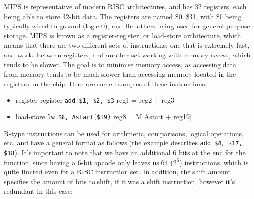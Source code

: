 \documentclass[a4paper, 12pt]{article}
\begin{document}
            MIPS is representative of modern RISC architectures, and has 32 registers, each being able to store 32-bit data. The registers are named \$0..\$31, with \$0 being typically wired to ground (logic 0), and the others being used for general-purpose storage. MIPS is known as a register-register, or load-store architecture, which means that there are two different sets of instructions; one that is extremely fast, and works between registers, and another set working with memory access, which tends to be slower. The goal is to minimise memory access, as accessing data from memory tends to be much slower than accessing memory located in the registers on the chip. Here are some examples of these instructions;
            \begin{itemize}
                \itemsep0em
                \item register-register
                    \subitem \texttt{add \$1, \$2, \$3} \hfill reg1 = reg2 + reg3
                \item load-store
                    \subitem \texttt{lw \$8, Astart(\$19)} \hfill reg8 = M[Astart + reg19]
            \end{itemize}
            R-type instructions can be used for arithmetic, comparisons, logical operations, etc. and have a general format as follows (the example describes \texttt{add \$8, \$17, \$18}). It's important to note that we have an additional 6 bits at the end for the function, since having a 6-bit opcode only leaves us 64 ($2^6$) instructions, which is quite limited even for a RISC instruction set. In addition, the shift amount specifies the amount of bits to shift, if it was a shift instruction, however it's redundant in this case;
\end{document}
